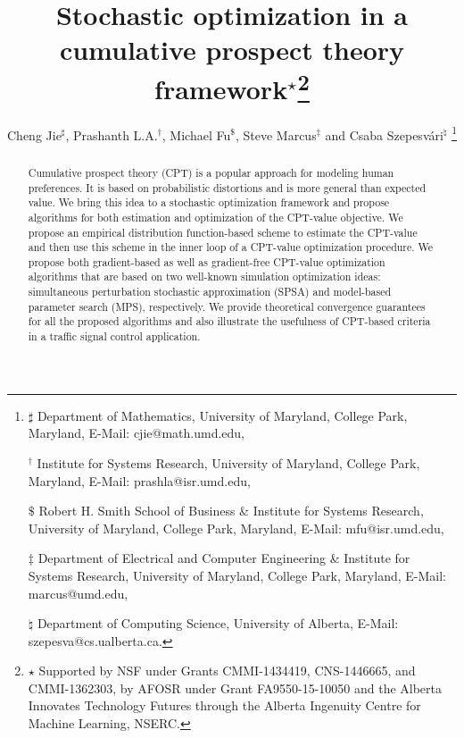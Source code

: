\documentclass[twocolumn]{IEEEtran}
\begin{document}
\title{Stochastic optimization in a cumulative prospect theory framework$^\star$\thanks{$\star$ Supported by NSF under Grants CMMI-1434419, CNS-1446665, and
CMMI-1362303, by AFOSR under Grant FA9550-15-10050 and the Alberta Innovates Technology Futures through the Alberta Ingenuity Centre for Machine Learning, NSERC.}}
\author{Cheng Jie$^\sharp$, Prashanth L.A.$^\dagger$, Michael Fu$^\$$, Steve Marcus$^\ddag$ and Csaba Szepesv\'ari$^\natural$
\thanks{
$\sharp$ Department of Mathematics,
University of Maryland, College Park, Maryland, 
E-Mail: cjie@math.umd.edu, 

$^\dagger$ Institute for Systems Research, University of Maryland, College Park, Maryland,
E-Mail: prashla@isr.umd.edu,

$\$$ Robert H. Smith School of Business \& Institute for Systems Research,
University of Maryland, College Park, Maryland,
E-Mail: mfu@isr.umd.edu,

$\ddag$ Department of Electrical and Computer Engineering \& Institute for Systems Research,
University of Maryland, College Park, Maryland,
 E-Mail: marcus@umd.edu,

$\natural$ Department of Computing Science,
University of Alberta,
 E-Mail: szepesva@cs.ualberta.ca.
}}
\maketitle


\begin{abstract}
Cumulative prospect theory (CPT) is a popular approach for modeling human preferences. It is based on probabilistic distortions and is more general than expected value.  We bring this idea to a stochastic optimization framework and propose algorithms for both estimation and optimization of the CPT-value objective. We propose an empirical distribution function-based scheme to estimate the CPT-value and then use this scheme in the inner loop of a CPT-value optimization procedure. We propose both gradient-based as well as gradient-free CPT-value optimization algorithms that are based on two well-known simulation optimization ideas: simultaneous perturbation stochastic approximation (SPSA) and model-based parameter search (MPS), respectively.  We provide theoretical convergence guarantees for all the proposed algorithms 
and also illustrate the usefulness of CPT-based criteria in a traffic signal control application.
\end{abstract}
\end{document}
